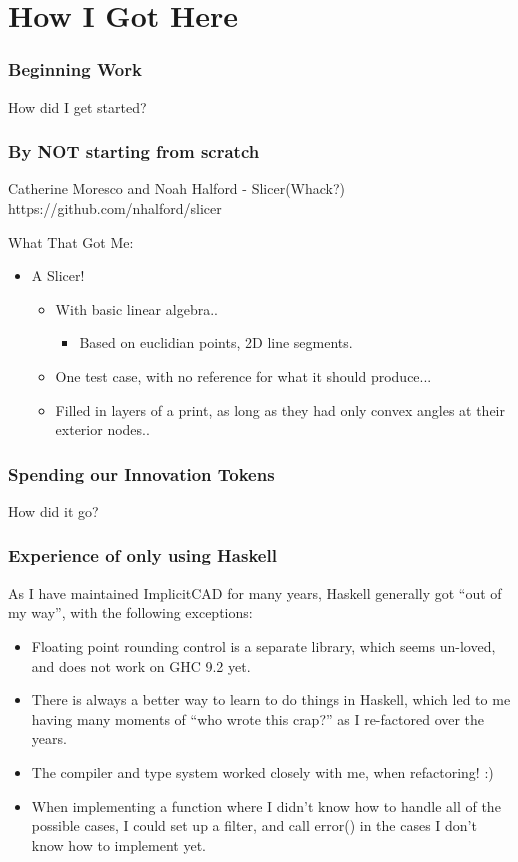 \documentclass[hyperref={pdfpagemode=FullScreen},aspectratio=169]{beamer}
\begin{document}
\section{How I Got Here}

\begin{frame}
  \frametitle{Beginning Work}
  \Huge{\centerline{How did I get started?}}
\end{frame}

\begin{frame}
  \frametitle{By NOT starting from scratch}
  \begin{block}{Catherine Moresco and Noah Halford - Slicer(Whack?)}
    https://github.com/nhalford/slicer
  \end{block}
  What That Got Me:
  \begin{itemize}
  \item A Slicer!
    \begin{itemize}
    \item With basic linear algebra..
      \begin{itemize}
      \item Based on euclidian points, 2D line segments.
      \end{itemize}
    \item One test case, with no reference for what it should produce...
    \item Filled in layers of a print, as long as they had only convex angles at their exterior nodes..
    \end{itemize}
  \end{itemize}
\end{frame}

\begin{frame}
  \frametitle{Spending our Innovation Tokens}
  \Huge{\centerline{How did it go?}}
\end{frame}

\begin{frame}
  \frametitle{Experience of only using Haskell}
  As I have maintained ImplicitCAD for many years, Haskell generally got ``out of my way'', with the following exceptions:
  \begin{itemize}
  \item Floating point rounding control is a separate library, which seems un-loved, and does not work on GHC 9.2 yet.
  \item There is always a better way to learn to do things in Haskell, which led to me having many moments of ``who wrote this crap?'' as I re-factored over the years.
  \item The compiler and type system worked closely with me, when refactoring! :)
  \item When implementing a function where I didn't know how to handle all of the possible cases, I could set up a filter, and call error() in the cases I don't know how to implement yet.
  \end{itemize}
\end{frame}
\end{document}
